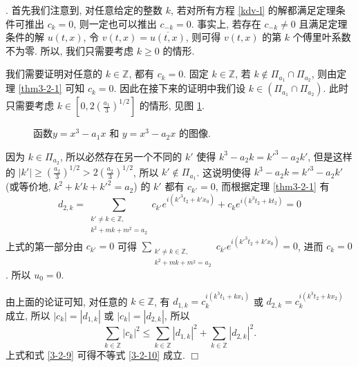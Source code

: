 \documentclass[master]{cugthesis}
\newcommand\Z{\ensuremath{\mathbb{Z}}}
\newenvironment{proof}{{\noindent\itshape 证明}.}{\hfill $\Box$\par}
\begin{document}
    \begin{proof}
    首先我们注意到, 对任意给定的整数 $k$, 若对所有方程 \eqref{kdv-l} 的解都满足定理条件可推出 $c_k=0$, 则一定也可以推出 $c_{-k}=0$. 事实上, 若存在 $c_{-k}\neq 0$ 且满足定理条件的解 $u(t,x)$, 令 $v(t,x)=\overline{u(t,x)}$, 则可得 $v(t,x)$ 的第 $k$ 个傅里叶系数不为零.
    所以, 我们只需要考虑 $k\ge 0$ 的情形.


    
      我们需要证明对任意的 $k\in\Z$, 都有 $c_k=0$. 固定 $k\in \Z$, 若 $k\notin \Pi_{a_1}\cap \Pi_{a_2}$, 则由定理 \ref{thm3-2-1} 可知 $c_k=0$. 因此在接下来的证明中我们设 $k\in  \left(\Pi_{a_1}\cap \Pi_{a_2}\right)$. 此时只需要考虑 $k\in \left[0, 2\left(\frac{a_1}{3}\right)^{1 /2}\right]$ 的情形, 见图 \ref{fig6}.
          \begin{figure}[ht]
        \centering
        \caption{函数$y=x^3-a_1x$ 和 $y=x^3-a_2 x$ 的图像.}
        \label{fig6}
    \end{figure}
     因为 $k\in \Pi_{a_2} $, 所以必然存在另一个不同的 $k'$ 使得 $k^3-a_2k={k'}^3-a_2k'$, 但是这样的 $|k'|\ge\left(\frac{a_2}{3}\right)^{1 /2}>2\left(\frac{a_2}{3}\right)^{1 /2}$, 所以 $k'\notin \Pi_{a_1}$. 这说明使得 $k^3-a_2k=k'^3-a_2k'$ (或等价地, $k^2+k'k+k'^2=a_2$) 的 $k'$ 都有 $c_{k'}=0$, 而根据定理 \ref{thm3-2-1} 有
     \begin{equation*}
         d_{2,k}=\sum\limits_{\substack{k'\neq k\in \Z,\\ k^2+mk+m^2=a_2}} c_{k'}e^{i(k'^3t_2+k'x_0)}+c_k e^{i(k^3t_2+kt_2)}=0
     \end{equation*}
     上式的第一部分由 $c_{k'}=0$ 可得 $\sum_{\substack{k'\neq k\in \Z,\\ k^2+mk+m^2=a_2}} c_{k'}e^{i(k'^3t_2+k'x_0)}=0$, 进而 $c_k=0$. 所以 $u_0=0$.
  
  由上面的论证可知, 对任意的 $k\in \Z$, 有 $d_{1,k}=c_k^{i(k^3t_1+kx_1)}$ 或 $d_{2,k}=c_k^{i(k^3t_2+kx_2)}$ 成立, 所以 $|c_k|=|d_{1,k}|$ 或 $|c_k|=|d_{2,k}|$, 所以
  \begin{equation*}
      \sum_{k\in \Z}|c_k|^2\le \sum_{k\in \Z}|d_{1,k}|^2+\sum_{k\in\Z}|d_{2,k}|^2.
  \end{equation*}
  上式和式 \eqref{3-2-9} 可得不等式 \eqref{3-2-10} 成立.   
      \end{proof}
    
\end{document}
